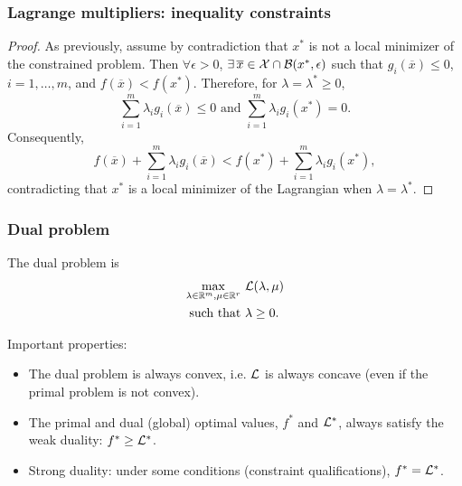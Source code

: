 \documentclass[usepdftitle=false,aspectratio=169]{beamer}
\def\blue{\color{blue}}
\begin{document}
\begin{frame}
\frametitle{Lagrange multipliers: inequality constraints}
	
\begin{proof}
	As previously, assume by contradiction that $x^*$ is not a local minimizer of the constrained problem.
Then $\forall \epsilon > 0$, $\exists\, \overline{x} \in {\mathcal{X}} \cap {\mathcal{B}}(x^*, \epsilon)$ such that $g_i(\overline{x}) \leq 0$, $i = 1,\ldots,m$, and $f(\overline{x}) < f(x^*)$.
Therefore, for $\lambda = \lambda^* \geq 0$,
$$
\sum_{i = 1}^{m} \lambda_i g_i(\overline{x}) \leq 0 \mbox{ and }
\sum_{i = 1}^{m} \lambda_i g_i(x^*) = 0.
$$
Consequently,
$$
f(\overline{x}) + \sum_{i = 1}^{m} \lambda_i g_i(\overline{x}) < f(x^*) + \sum_{i = 1}^{m} \lambda_i g_i(x^*),
$$
contradicting that $x^*$ is a local minimizer of the Lagrangian when $\lambda = \lambda^*$.
\end{proof}

\end{frame}

\begin{frame}
\frametitle{Dual problem}

The dual problem is
\begin{align*}
\max_{\lambda \in {\mathbb{R}}^m, \mu \in {\mathbb{R}}^r}\ & {\mathcal{L}}(\lambda, \mu) \\
\mbox{such that } & \lambda \geq 0.
\end{align*}

Important properties:
\begin{itemize}
\item
The dual problem is always convex, i.e. ${\mathcal{L}}$ is always concave (even if the primal problem is not convex).
\item
The primal and dual (global) optimal values, $f^*$ and ${\mathcal{L}}^*$, always satisfy the weak duality: $f^* \geq {\mathcal{L}}^*$.
\item {\blue Strong duality}: under some conditions (constraint qualifications), $f^* = {\mathcal{L}}^*$.
\end{itemize}

\end{frame}
\end{document}

